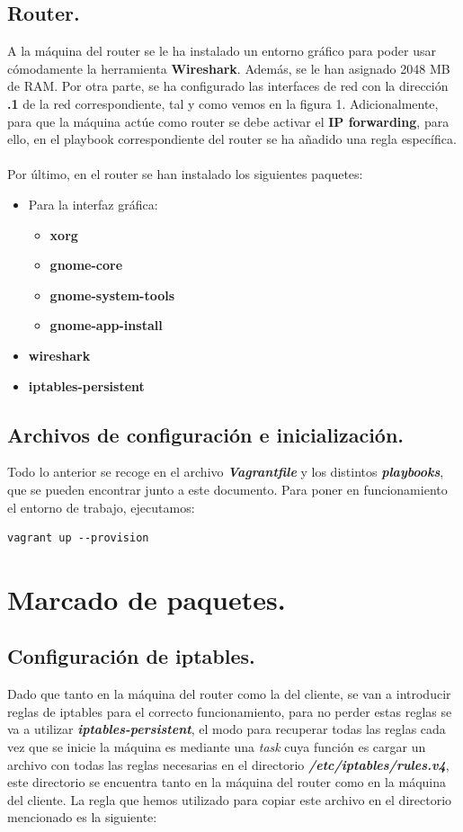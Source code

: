 \documentclass[11pt]{article}
\begin{document}
\subsection{Router.}
A la máquina del router se le ha instalado un entorno gráfico para poder usar cómodamente la herramienta \textbf{Wireshark}. Además, se le han asignado 2048 MB de RAM. Por otra parte, se ha configurado las interfaces de red con la dirección \textbf{.1} de la red correspondiente, tal y como vemos en la figura 1. Adicionalmente, para que la máquina actúe como router se debe activar el \textbf{IP forwarding}, para ello, en el playbook correspondiente del router se ha añadido una regla específica. \\ \\
Por último, en el router se han instalado los siguientes paquetes:
\begin{itemize}
\item Para la interfaz gráfica:
	\begin{itemize}
		\item \textbf{xorg}
		\item \textbf{gnome-core}
		\item \textbf{gnome-system-tools}
		\item \textbf{gnome-app-install}
	\end{itemize}
\item \textbf{wireshark}
\item \textbf{iptables-persistent}			
\end{itemize}

\subsection{Archivos de configuración e inicialización.}
Todo lo anterior se recoge en el archivo \textbf{\textit{Vagrantfile}} y los distintos \textbf{\textit{playbooks}}, que se pueden encontrar junto a este documento. Para poner en funcionamiento el entorno de trabajo, ejecutamos:
\begin{lstlisting}[style=C,numbers=none]
	vagrant up --provision
\end{lstlisting}

\section{Marcado de paquetes.}
\subsection{Configuración de iptables.}
Dado que tanto en la máquina del router como la del cliente, se van a introducir reglas de iptables para el correcto funcionamiento, para no perder estas reglas se va a utilizar \textbf{\textit{iptables-persistent}}, el modo para recuperar todas las reglas cada vez que se inicie la máquina es mediante una \textit{task} cuya función es cargar un archivo con todas las reglas necesarias en el directorio \textbf{\textit{/etc/iptables/rules.v4}}, este directorio se encuentra tanto en la máquina del router como en la máquina del cliente. La regla que hemos utilizado para copiar este archivo en el directorio mencionado es la siguiente:
\end{document}
